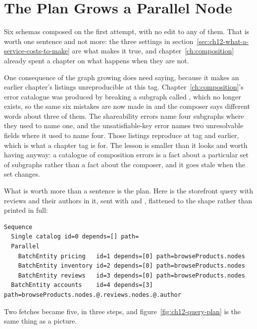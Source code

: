 \section{The Plan Grows a Parallel Node}
\label{sec:ch12-the-plan-grows-a-parallel-node}
%

Six schemas composed on the first attempt, with no edit to any of them. That is
worth one sentence and not more: the three settings in
section~\ref{sec:ch12-what-a-service-costs-to-make} are what makes it true, and
chapter~\ref{ch:composition} already spent a chapter on what happens when they
are not.

%
One consequence of the graph growing does need saying, because it makes an
earlier chapter's listings unreproducible at this tag.
Chapter~\ref{ch:composition}'s error catalogue was produced by breaking a
subgraph called , which no longer exists, so the same six mistakes
are now made in  and the composer says different words about three
of them. The shareability errors name four subgraphs where they used to name
one, and the unsatisfiable-key error names two unresolvable fields where it used
to name four. Those listings reproduce at tag  and earlier, which is
what a chapter tag is for. The lesson is smaller than it looks and worth having
anyway: a catalogue of composition errors is a fact about a particular set of
subgraphs rather than a fact about the composer, and it goes stale when the set
changes.

What is worth more than a sentence is the plan. Here is the storefront query
with reviews and their authors in it, sent with
 and , flattened to the
shape rather than printed in full:

\begin{verbatim}
Sequence
  Single catalog id=0 depends=[] path=
  Parallel
    BatchEntity pricing   id=1 depends=[0] path=browseProducts.nodes
    BatchEntity inventory id=2 depends=[0] path=browseProducts.nodes
    BatchEntity reviews   id=3 depends=[0] path=browseProducts.nodes
  BatchEntity accounts    id=4 depends=[3] path=browseProducts.nodes.@.reviews.nodes.@.author
\end{verbatim}

Two fetches became five, in three steps, and
figure~\ref{fig:ch12-query-plan} is the same thing as a picture.

